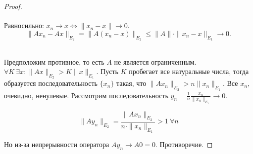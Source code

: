 \begin{proof}\\
\textit{}\\
Равносильно: $x_n \to x \Leftrightarrow \|x_n - x\| \to 0$.
\[
\|Ax_n - Ax\|_{E_2} = \|A(x_n - x)\|_{E_2} \leqslant \|A\| \cdot \|x_n - x\|_{E_1} \to 0.
\]

\noindent\textit{}\\
Предположим противное, то есть $A$ не является ограниченным. 
$\forall K\ \exists x : \|Ax\|_{E_2} > K \|x\|_{E_1}$. Пусть $K$ пробегает все натуральные числа, тогда образуется последовательность $\{x_n\}$ такая, что $\|Ax_n\|_{E_2} > n \|x_n\|_{E_1}$. Все $x_n$, очевидно, ненулевые.
Рассмотрим последовательность $y_n = \frac{1}{n} \frac{x_n}{\|x_n\|_{E_1}} \to 0$.

\[
\|A y_n\|_{E_2} = \frac{\|A x_n\|_{E_2}}{n \cdot \|x_n\|_{E_1}} > 1\ \forall n
\]

Но из-за непрерывности оператора $A y_n \to A 0 = 0$. Противоречие.
\end{proof}